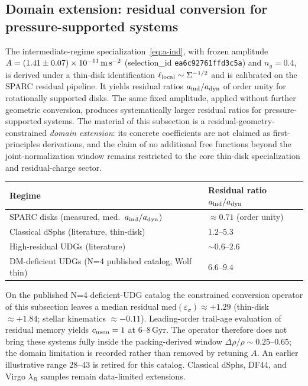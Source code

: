 \documentclass[11pt,a4paper]{article}
\begin{document}
\subsection{Domain extension: residual conversion for pressure-supported systems}
\label{sec:udg-domain}

The intermediate-regime specialization~\eqref{eq:a-ind}, with frozen amplitude \(A=(1.41\pm0.07)\times10^{-11}\,{\rm m\,s^{-2}}\) (selection\_id \texttt{ea6c92761ffd3c5a}) and \(n_g=0.4\), is derived under a thin-disk identification \(\ell_{\rm local}\sim\Sigma^{-1/2}\) and is calibrated on the SPARC residual pipeline. It yields residual ratios \(a_{\rm ind}/a_{\rm dyn}\) of order unity for rotationally supported disks. The same fixed amplitude, applied without further geometric conversion, produces systematically larger residual ratios for pressure-supported systems. The material of this subsection is a residual-geometry-constrained \emph{domain extension}: its concrete coefficients are not claimed as first-principles derivations, and the claim of no additional free functions beyond the joint-normalization window remains restricted to the core thin-disk specialization and residual-charge sector.

\begin{center}
\begin{tabular}{@{}ll@{}}
\toprule
Regime & Residual ratio \(a_{\rm ind}/a_{\rm dyn}\) \\
\midrule
SPARC disks (measured, med.\ \(a_{\rm ind}/a_{\rm dyn}\)) & \(\approx 0.71\) (order unity) \\
Classical dSphs (literature, thin-disk) & \(1.2\)--\(5.3\) \\
High-residual UDGs (literature) & \(\sim0.6\)--\(2.6\) \\
DM-deficient UDGs (N=4 published catalog, Wolf thin) & \(6.6\)--\(9.4\) \\
\bottomrule
\end{tabular}
\end{center}

\noindent On the published N=4 deficient-UDG catalog the constrained conversion operator of this subsection leaves a median residual \(\mathrm{med}(\varepsilon_\sigma)\approx +1.29\) (thin-disk \(\approx +1.84\); stellar kinematics \(\approx -0.11\)). Leading-order trail-age evaluation of residual memory yields \(c_{\rm mem}=1\) at \(6\)--\(8\,\mathrm{Gyr}\). The operator therefore does not bring these systems fully inside the packing-derived window \(\Delta\rho/\rho\sim0.25\)--\(0.65\); the domain limitation is recorded rather than removed by retuning \(A\). An earlier illustrative range \(28\)--\(43\) is retired for this catalog. Classical dSphs, DF44, and Virgo \(\lambda_R\) samples remain data-limited extensions.
\end{document}
